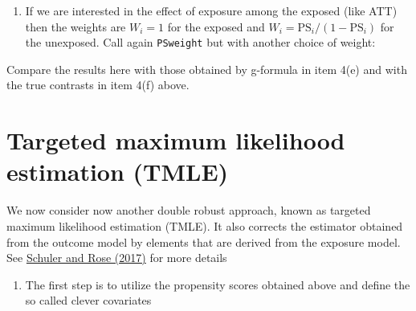 \documentclass[
]{book}
\newenvironment{Shaded}{\begin{snugshade}}{\end{snugshade}}
\newcommand{\AttributeTok}[1]{\textcolor[rgb]{0.13,0.29,0.53}{#1}}
\newcommand{\DecValTok}[1]{\textcolor[rgb]{0.00,0.00,0.81}{#1}}
\newcommand{\FunctionTok}[1]{\textcolor[rgb]{0.13,0.29,0.53}{\textbf{#1}}}
\newcommand{\NormalTok}[1]{#1}
\newcommand{\OtherTok}[1]{\textcolor[rgb]{0.56,0.35,0.01}{#1}}
\newcommand{\SpecialCharTok}[1]{\textcolor[rgb]{0.81,0.36,0.00}{\textbf{#1}}}
\newcommand{\StringTok}[1]{\textcolor[rgb]{0.31,0.60,0.02}{#1}}
\providecommand{\tightlist}{%
  \setlength{\itemsep}{0pt}\setlength{\parskip}{0pt}}
\begin{document}
\begin{enumerate}
\def\labelenumi{\arabic{enumi}.}
\setcounter{enumi}{3}
\tightlist
\item
  If we are interested in the effect of exposure among the exposed
  (like ATT)
  then the weights are \(W_i = 1\) for the exposed and
  \(W_i = \text{PS}_i/(1-\text{PS}_i)\) for the unexposed.
  Call again \texttt{PSweight} but with another choice of weight:
\end{enumerate}

\begin{Shaded}
\end{Shaded}

Compare the results here with those
obtained by g-formula in item 4(e) and with the
true contrasts in item 4(f) above.

\section{Targeted maximum likelihood estimation (TMLE)}\label{targeted-maximum-likelihood-estimation-tmle}

We now consider now another double robust approach,
known as targeted maximum likelihood estimation (TMLE).
It also corrects the estimator obtained from the outcome model
by elements that are derived from the exposure model.
See \href{https://doi.org/10.1093/aje/kww165}{Schuler and Rose (2017)}
for more details

\begin{enumerate}
\def\labelenumi{\arabic{enumi}.}
\tightlist
\item
  The first step is to utilize the propensity scores obtained
  above and define the so called clever covariates
\end{enumerate}
\end{document}
